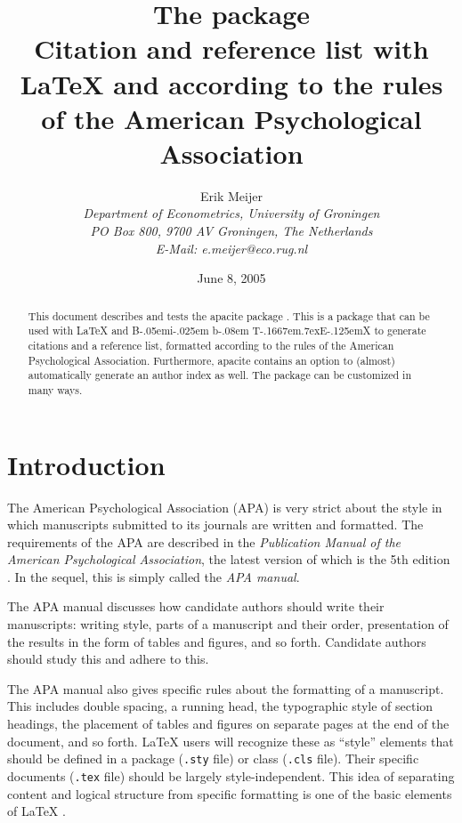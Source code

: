 \documentclass{article}
\title{The \pkg{apacite} package\vspace{0.3\baselineskip}\\
       \large Citation and reference list with \LaTeX{} and \BibTeX{}
       according to the rules of the American Psychological Association}
\author{Erik Meijer\\
        \normalsize\itshape
        Department of Econometrics,
        University of Groningen\\
        \normalsize\itshape
        PO Box 800,
        9700 AV Groningen,
        The Netherlands\\
        \normalsize
        E-Mail: \textsf{e.meijer@eco.rug.nl}
}
\date{June 8, 2005}
\def\BibTeX{{\rm B\kern-.05em{\sc i\kern-.025em b}\kern-.08em
    T\kern-.1667em\lower.7ex\hbox{E}\kern-.125emX}}%
\newcommand{\APACversiondate}[1]{\relax [#1]}
\newcommand{\pkg}[1]{\textsf{#1}}%
\newcommand{\fname}[1]{\texttt{#1}}%
\begin{document}
\maketitle
\begin{abstract}
  \noindent
  This document describes and tests the \pkg{apacite} package
  \APACversiondate{2005/06/08}. This is a package that can be used with
  \LaTeX{} and \BibTeX{} to generate citations and a reference list,
  formatted according to the rules of the American Psychological Association.
  Furthermore, \pkg{apacite} contains an option to (almost) automatically
  generate an author index as well. The package can be customized in many
  ways.
\end{abstract}
\tableofcontents
\section{Introduction}
The American Psychological Association (APA) is very strict about the style in
which manuscripts submitted to its journals are written and formatted. The
requirements of the APA are described in the \emph{Publication Manual of the
American Psychological Association}, the latest version of which is the 5th
edition \cite{APAManual}. In the sequel, this is simply called the \emph{APA
manual}.

The APA manual discusses how candidate authors should write their manuscripts:
writing style, parts of a manuscript and their order, presentation of the
results in the form of tables and figures, and so forth. Candidate authors
should study this and adhere to this.

The APA manual also gives specific rules about the formatting of a manuscript.
This includes double spacing, a running head, the typographic style of section
headings, the placement of tables and figures on separate pages at the end of
the document, and so forth. \LaTeX{} users will recognize these as ``style''
elements that should be defined in a package (\fname{.sty} file) or class
(\fname{.cls} file). Their specific documents (\fname{.tex} file) should be
largely style-independent. This idea of separating content and logical
structure from specific formatting is one of the basic elements of \LaTeX{}
\cite[p.~7]{LaTeXbook}.
\end{document}
